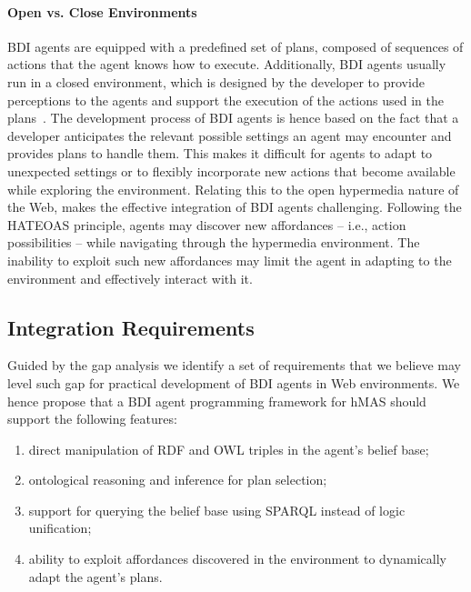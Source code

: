 \documentclass[
]{ceurart}
\begin{document}
\paragraph{Open vs. Close Environments}
\ac{BDI} agents are equipped with a predefined set of plans, composed of sequences of actions that the agent knows how to execute.
%
Additionally, \ac{BDI} agents usually run in a closed environment,
which is designed by the developer to provide perceptions to the agents and 
support the execution of the actions used in the plans~\cite{weyns2007aamas}. 
%
The development process of \ac{BDI} agents is hence based on the fact that a developer anticipates 
the relevant possible settings an agent may encounter and provides plans to handle them.
%
This makes it difficult for agents to adapt to unexpected settings or to flexibly incorporate new actions that become available while exploring the environment.
%
Relating this to the open hypermedia nature of the Web, makes the effective integration of \ac{BDI} agents challenging.
%
Following the \ac{HATEOAS} principle, agents may discover new affordances
-- i.e., action possibilities --
while navigating through the hypermedia environment.
%
The inability to exploit such new affordances may limit the agent in adapting to the environment and effectively interact with it.

\subsection{Integration Requirements}
\label{sec:integrating-bdi-hypermedia}

Guided by the gap analysis
we identify a set of requirements that we believe may level such gap for practical development of \ac{BDI} agents in Web environments.
We hence propose that a \ac{BDI} agent programming framework for \ac{hMAS} should support the following features:
\begin{enumerate}[label={(R\arabic*)}]
  \item direct manipulation of \ac{RDF} and \ac{OWL} triples in the agent's belief base;
  \label{req:first}
  \item ontological reasoning and inference for plan selection;
  \label{req:second}
  \item support for querying the belief base using \ac{SPARQL} instead of logic unification;
  \label{req:third}
  \item ability to exploit affordances discovered in the environment to dynamically adapt the agent's plans.
  \label{req:fourth}
\end{enumerate}
\end{document}

